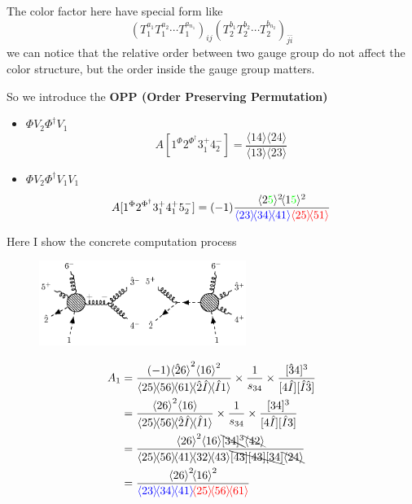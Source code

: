\documentclass{beamer}
\newcommand{\avg}[1]{\langle #1 \rangle}
\newcommand{\mdavg}[2]{\langle #1 \rangle\!\langle #2 \rangle}
\newcommand{\asqu}[1]{{\langle#1\rangle}^2}
\begin{document}
\begin{frame}
\begin{center}
\begin{tikzpicture}[x=0.75pt,y=0.75pt,yscale=0.8,xscale=0.8]
        \end{tikzpicture}
    \end{center}
    The color factor here have special form like
    \begin{equation*}
         (T_1^{a_1}T_1^{a_2}\cdots T_1^{a_{n_1}})_{ij}(T_2^{b_1}T_2^{b_2}\cdots T_2^{b_{n_2}})_{\bar{j}\bar{i}}
    \end{equation*}
     we can notice that the relative order between two gauge group do not affect the color structure, but the
    order inside the gauge group matters.
\end{frame}

\begin{frame}
    So we introduce the \textbf{OPP (Order Preserving Permutation)}
    \begin{itemize}
        \item $\Phi V_2 \Phi^\dagger V_1$
        \begin{equation*}
            A[1^\Phi2^{\Phi^\dagger}3_1^+4_2^-]=\frac{\mdavg{14}{24}}{\mdavg{13}{23}}
        \end{equation*}
        \item $\Phi V_2 \Phi^\dagger V_1V_1$
        \begin{equation*}
            A[1^\Phi2^{\Phi^\dagger}3_1^+4_1^+5_2^-]=(-1)\frac{\avg{2\textcolor{green}{5}}^2\!\avg{1\textcolor{green}{5}}^2}{\textcolor{blue}{\mdavg{23}{34}\!\avg{41}}\textcolor{red}{\mdavg{25}{51}}}
        \end{equation*}  
    \end{itemize}
\end{frame}
\begin{frame}
    Here I show the concrete computation process 
    \begin{figure}
        \centering
        \includegraphics[width=0.6\textwidth]{6pt.eps}
    \end{figure}
    \vspace{-1em}
    \begin{align*}
    A_1&=\frac{(-1)\asqu{\hat{2}6}\asqu{16}}{\mdavg{25}{56}\!\avg{61}\!\mdavg{\hat{2}\hat{I}}{\hat{I}1}}\times\frac{1}{s_{34}}\times\frac{[\hat{3}4]^3}{[4\hat{I}][\hat{I}\hat{3}]}\notag\\
    &=\frac{\asqu{26}\avg{16}}{\mdavg{25}{56}\!\mdavg{\hat{2}\hat{I}}{\hat{I}1}}\times\frac{1}{s_{34}}\times\frac{[34]^3}{[4\hat{I}][\hat{I}3]}\notag\\
    &=\frac{\asqu{26}\avg{16}\bcancel{[34]^3}\bcancel{\avg{42}}}{\mdavg{25}{56}\!\mdavg{41}{32}\!\avg{43}\bcancel{[43][43][34]}\bcancel{\avg{24}}}\notag\\
    &=\frac{\asqu{26}\!\asqu{16}}{\textcolor{blue}{\mdavg{23}{34}\!\avg{41}}\!\textcolor{red}{\mdavg{25}{56}\!\avg{61}}}
    \end{align*}
\end{frame}
\end{document}
